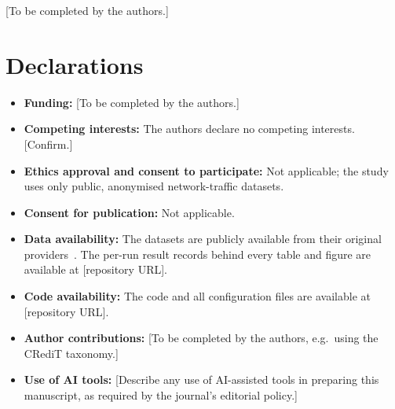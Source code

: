 \documentclass[pdflatex,sn-mathphys-num]{sn-jnl}
\begin{document}
\backmatter

[To be completed by the authors.]

\section*{Declarations}

\begin{itemize}
\item \textbf{Funding:} [To be completed by the authors.]
\item \textbf{Competing interests:} The authors declare no competing interests. [Confirm.]
\item \textbf{Ethics approval and consent to participate:} Not applicable; the study uses only public, anonymised network-traffic datasets.
\item \textbf{Consent for publication:} Not applicable.
\item \textbf{Data availability:} The datasets are publicly available from their original providers~\cite{sarhan2022standard,moustafa2021toniot,sharafaldin2018cicids}. The per-run result records behind every table and figure are available at [repository URL].
\item \textbf{Code availability:} The code and all configuration files are available at [repository URL].
\item \textbf{Author contributions:} [To be completed by the authors, e.g.\ using the CRediT taxonomy.]
\item \textbf{Use of AI tools:} [Describe any use of AI-assisted tools in preparing this manuscript, as required by the journal's editorial policy.]
\end{itemize}


\end{document}
